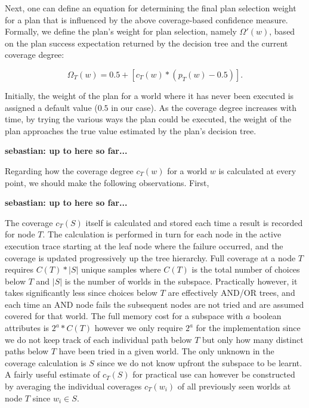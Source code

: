Next, one can define an equation for determining the final plan selection weight
for a plan that is influenced by the above coverage-based confidence measure.
Formally, we define the plan's weight for plan selection, namely $\Omega'(w)$, based
on the plan success expectation returned by the decision tree and the current
coverage degree:

\begin{equation*}\label{eqn:coverage}   
\Omega_T(w) = 0.5 + \left[  c_T(w) *  \left( p_T(w) - 0.5 \right)  \right].
\end{equation*}
	
	
Initially, the weight of the plan for a world where it has never been executed is
assigned a default value ($0.5$ in our case).
As the coverage degree increases with time, by trying the various ways the plan
could be executed, the weight of the plan approaches the true value estimated by
the plan's decision tree.


\textbf{sebastian: up to here so far...}


Regarding how the coverage degree $c_T(w)$ for a world $w$ is calculated at
every point, we should make the following observations.
First,


\textbf{sebastian: up to here so far...}


The coverage $c_T(S)$ itself is calculated and stored each time a
result is recorded for node $T$. The calculation is performed in turn
for each node in the active execution trace starting at the leaf node
where the failure occurred, and the coverage is updated progressively
up the tree hierarchy. Full coverage at a node $T$ requires $C(T)*|S|$
unique samples where $C(T)$ is the total number of choices below $T$
and $|S|$ is the number of worlds in the subspace. Practically
however, it takes significantly less since choices below $T$ are
effectively AND/OR trees, and each time an AND node fails the
subsequent nodes are not tried and are assumed covered for that
world. The full memory cost for a subspace with $a$ boolean attributes
is $2^a*C(T)$ however we only require $2^a$ for the implementation
since we do not keep track of each individual path below $T$ but only
how many distinct paths below $T$ have been tried in a given
world. The only unknown in the coverage calculation is $S$ since we do
not know upfront the subspace to be learnt. A fairly useful estimate
of $c_T(S)$ for practical use can however be constructed by averaging
the individual coverages $c_T(w_i)$ of all previously seen worlds at
node $T$ since $w_i \in S$.  

